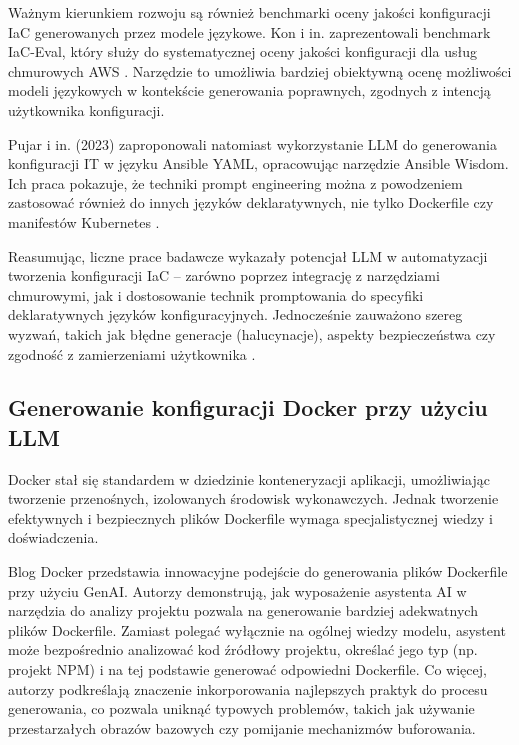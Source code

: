 Ważnym kierunkiem rozwoju są również benchmarki oceny jakości konfiguracji IaC generowanych przez modele językowe. Kon i in. zaprezentowali benchmark IaC-Eval, który służy do systematycznej oceny jakości konfiguracji dla usług chmurowych AWS \cite{kon_iac-eval_nodate}. Narzędzie to umożliwia bardziej obiektywną ocenę możliwości modeli językowych w kontekście generowania poprawnych, zgodnych z intencją użytkownika konfiguracji.

Pujar i in. (2023) zaproponowali natomiast wykorzystanie LLM do generowania konfiguracji IT w języku Ansible YAML, opracowując narzędzie Ansible Wisdom. Ich praca pokazuje, że techniki prompt engineering można z powodzeniem zastosować również do innych języków deklaratywnych, nie tylko Dockerfile czy manifestów Kubernetes \cite{pujar_invited_2023}.

Reasumując, liczne prace badawcze wykazały potencjał LLM w automatyzacji tworzenia konfiguracji IaC – zarówno poprzez integrację z narzędziami chmurowymi, jak i dostosowanie technik promptowania do specyfiki deklaratywnych języków konfiguracyjnych. Jednocześnie zauważono szereg wyzwań, takich jak błędne generacje (halucynacje), aspekty bezpieczeństwa czy zgodność z zamierzeniami użytkownika \cite{malul_genkubesec_2024, kratzke_dont_2024}.

\subsection{Generowanie konfiguracji Docker przy użyciu LLM}

Docker stał się standardem w dziedzinie konteneryzacji aplikacji, umożliwiając tworzenie przenośnych, izolowanych środowisk wykonawczych. Jednak tworzenie efektywnych i bezpiecznych plików Dockerfile wymaga specjalistycznej wiedzy i doświadczenia.

Blog Docker przedstawia innowacyjne podejście do generowania plików Dockerfile przy użyciu GenAI. Autorzy demonstrują, jak wyposażenie asystenta AI w narzędzia do analizy projektu pozwala na generowanie bardziej adekwatnych plików Dockerfile. Zamiast polegać wyłącznie na ogólnej wiedzy modelu, asystent może bezpośrednio analizować kod źródłowy projektu, określać jego typ (np. projekt NPM) i na tej podstawie generować odpowiedni Dockerfile. Co więcej, autorzy podkreślają znaczenie inkorporowania najlepszych praktyk do procesu generowania, co pozwala uniknąć typowych problemów, takich jak używanie przestarzałych obrazów bazowych czy pomijanie mechanizmów buforowania. %


